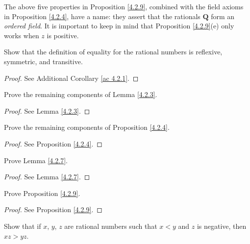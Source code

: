 \begin{remark}\label{4.2.10}
The above five properties in Proposition \ref{4.2.9}, combined with the field axioms in Proposition \ref{4.2.4}, have a name:
they assert that the rationals \(\mathbf{Q}\) form an \emph{ordered field}.
It is important to keep in mind that Proposition \ref{4.2.9}(e) only works when \(z\) is positive.
\end{remark}

\exercisesection

\begin{exercise}\label{ex 4.2.1}
Show that the definition of equality for the rational numbers is reflexive, symmetric, and transitive.
\end{exercise}

\begin{proof}
See Additional Corollary \ref{ac 4.2.1}.
\end{proof}

\begin{exercise}\label{ex 4.2.2}
Prove the remaining components of Lemma \ref{4.2.3}.
\end{exercise}

\begin{proof}
See Lemma \ref{4.2.3}.
\end{proof}

\begin{exercise}\label{ex 4.2.3}
Prove the remaining components of Proposition \ref{4.2.4}.
\end{exercise}

\begin{proof}
See Proposition \ref{4.2.4}.
\end{proof}

\begin{exercise}\label{ex 4.2.4}
Prove Lemma \ref{4.2.7}.
\end{exercise}

\begin{proof}
See Lemma \ref{4.2.7}.
\end{proof}

\begin{exercise}\label{ex 4.2.5}
Prove Proposition \ref{4.2.9}.
\end{exercise}

\begin{proof}
See Proposition \ref{4.2.9}.
\end{proof}

\begin{exercise}\label{ex 4.2.6}
Show that if \(x\), \(y\), \(z\) are rational numbers such that \(x < y\) and \(z\) is negative, then \(xz > yz\).
\end{exercise}

